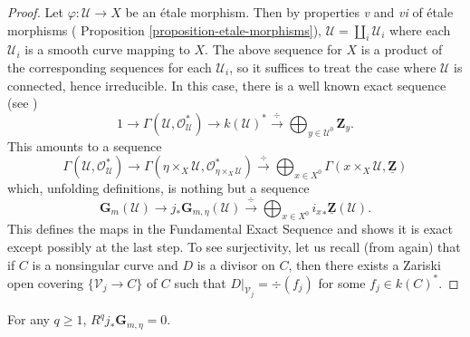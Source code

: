 \begin{proof}
Let $\varphi : \mathcal{U} \to X$ be an \'etale morphism. Then by properties
{\it v} and {\it vi} of \'etale morphisms (
Proposition \ref{proposition-etale-morphisms}),
$\mathcal{U} = \coprod_i \mathcal{U}_i$ where
each $\mathcal{U}_i$ is a smooth curve mapping to $X$. The above sequence for
$X$ is a product of the corresponding sequences for each $\mathcal{U}_i$, so it
suffices to treat the case where $\mathcal{U}$ is connected, hence irreducible.
In this case, there is a well known exact sequence (see \cite{H})
$$
1 \longrightarrow
\Gamma(\mathcal{U}, \mathcal{O}_\mathcal{U}^*) \longrightarrow
k(\mathcal{U})^* \xrightarrow{\ \div\ }
\bigoplus_{y \in \mathcal{U}^0} \mathbf{Z}_y.
$$
This amounts to a sequence
$$
\Gamma(\mathcal{U}, \mathcal{O}_\mathcal{U}^*) \longrightarrow
\Gamma(\eta \times_X\mathcal{U}, \mathcal{O}_{\eta \times_X\mathcal{U}}^*)
\xrightarrow{\ \div\ } \bigoplus_{x \in X^0}
\Gamma(x \times_X\mathcal{U}, \underline{\mathbf{Z}})
$$
which, unfolding definitions, is nothing but a sequence
$$
\mathbf{G}_m(\mathcal{U}) \longrightarrow j_* \mathbf{G}_{m, \eta}(\mathcal{U})
\xrightarrow{\ \div\ } \bigoplus_{x \in X^0} {i_x}_* \underline{\mathbf{Z}}
(\mathcal{U}).
$$
This defines the maps in the Fundamental Exact Sequence and shows it is exact
except possibly at the last step. To see surjectivity, let us recall (from
\cite{H} again) that if $C$ is a nonsingular curve and $D$ is a divisor on $C$,
then there exists a Zariski open covering $\{ \mathcal{V}_j \to C \}$ of $C$
such that $D |_{\mathcal{V}_j} = \div(f_j)$ for some $f_j \in k(C)^*$.
\end{proof}

\begin{lemma}
\label{lemma-higher-direct-jstar-Gm}
For any $q \geq 1$, $R^q j_*\mathbf{G}_{m, \eta} = 0$.
\end{lemma}

